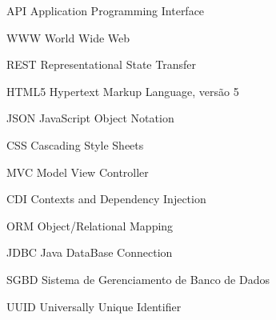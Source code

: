 \begin{siglas}
  \item[API] Application Programming Interface
  \item[WWW] World Wide Web
  \item[REST] Representational State Transfer
  \item[HTML5] Hypertext Markup Language, versão 5
  \item[JSON] JavaScript Object Notation
  \item[CSS] Cascading Style Sheets
  \item[MVC] Model View Controller
  \item[CDI] Contexts and Dependency Injection
  \item[ORM] Object/Relational Mapping
  \item[JDBC] Java DataBase Connection
  \item[SGBD] Sistema de Gerenciamento de Banco de Dados
  \item[UUID] Universally Unique Identifier
\end{siglas}
